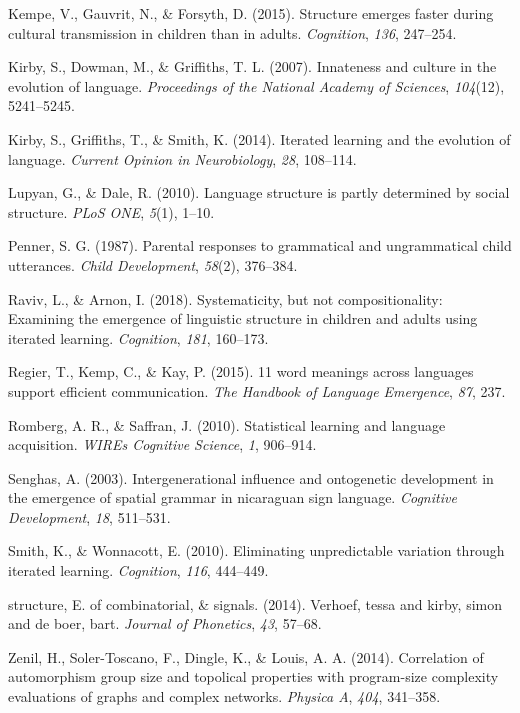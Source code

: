 \documentclass[10pt, letterpaper]{article}
\begin{document}
\hypertarget{ref-kempe-2015}{}
Kempe, V., Gauvrit, N., \& Forsyth, D. (2015). Structure emerges faster
during cultural transmission in children than in adults.
\emph{Cognition}, \emph{136}, 247--254.

\hypertarget{ref-kirby-2007}{}
Kirby, S., Dowman, M., \& Griffiths, T. L. (2007). Innateness and
culture in the evolution of language. \emph{Proceedings of the National
Academy of Sciences}, \emph{104}(12), 5241--5245.

\hypertarget{ref-kirby-2014}{}
Kirby, S., Griffiths, T., \& Smith, K. (2014). Iterated learning and the
evolution of language. \emph{Current Opinion in Neurobiology},
\emph{28}, 108--114.

\hypertarget{ref-lupyan-2010}{}
Lupyan, G., \& Dale, R. (2010). Language structure is partly determined
by social structure. \emph{PLoS ONE}, \emph{5}(1), 1--10.

\hypertarget{ref-penner-1987}{}
Penner, S. G. (1987). Parental responses to grammatical and
ungrammatical child utterances. \emph{Child Development}, \emph{58}(2),
376--384.

\hypertarget{ref-raviv-2018}{}
Raviv, L., \& Arnon, I. (2018). Systematicity, but not compositionality:
Examining the emergence of linguistic structure in children and adults
using iterated learning. \emph{Cognition}, \emph{181}, 160--173.

\hypertarget{ref-regier2015}{}
Regier, T., Kemp, C., \& Kay, P. (2015). 11 word meanings across
languages support efficient communication. \emph{The Handbook of
Language Emergence}, \emph{87}, 237.

\hypertarget{ref-romberg-2010}{}
Romberg, A. R., \& Saffran, J. (2010). Statistical learning and language
acquisition. \emph{WIREs Cognitive Science}, \emph{1}, 906--914.

\hypertarget{ref-senghas-2003}{}
Senghas, A. (2003). Intergenerational influence and ontogenetic
development in the emergence of spatial grammar in nicaraguan sign
language. \emph{Cognitive Development}, \emph{18}, 511--531.

\hypertarget{ref-smith-2010}{}
Smith, K., \& Wonnacott, E. (2010). Eliminating unpredictable variation
through iterated learning. \emph{Cognition}, \emph{116}, 444--449.

\hypertarget{ref-verhoef-2014}{}
structure, E. of combinatorial, \& signals. (2014). Verhoef, tessa and
kirby, simon and de boer, bart. \emph{Journal of Phonetics}, \emph{43},
57--68.

\hypertarget{ref-zenil-2014}{}
Zenil, H., Soler-Toscano, F., Dingle, K., \& Louis, A. A. (2014).
Correlation of automorphism group size and topolical properties with
program-size complexity evaluations of graphs and complex networks.
\emph{Physica A}, \emph{404}, 341--358.


\end{document}
